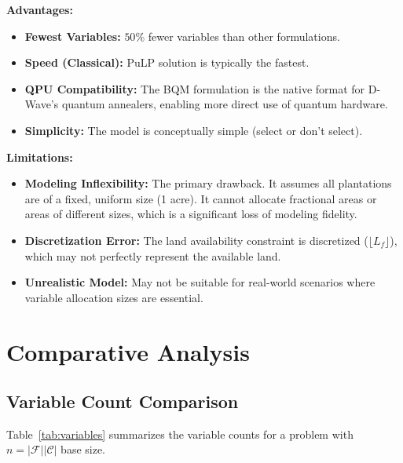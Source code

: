\documentclass[11pt,a4paper]{article}
\begin{document}
\textbf{Advantages:}
\begin{itemize}
    \item \textbf{Fewest Variables:} $50\%$ fewer variables than other formulations.
    \item \textbf{Speed (Classical):} PuLP solution is typically the fastest.
    \item \textbf{QPU Compatibility:} The BQM formulation is the native format for D-Wave's quantum annealers, enabling more direct use of quantum hardware.
    \item \textbf{Simplicity:} The model is conceptually simple (select or don't select).
\end{itemize}

\textbf{Limitations:}
\begin{itemize}
    \item \textbf{Modeling Inflexibility:} The primary drawback. It assumes all plantations are of a fixed, uniform size (1 acre). It cannot allocate fractional areas or areas of different sizes, which is a significant loss of modeling fidelity.
    \item \textbf{Discretization Error:} The land availability constraint is discretized ($\lfloor L_f \rfloor$), which may not perfectly represent the available land.
    \item \textbf{Unrealistic Model:} May not be suitable for real-world scenarios where variable allocation sizes are essential.
\end{itemize}

\section{Comparative Analysis}

\subsection{Variable Count Comparison}

Table~\ref{tab:variables} summarizes the variable counts for a problem with $n = |\mathcal{F}||\mathcal{C}|$ base size.
\end{document}
